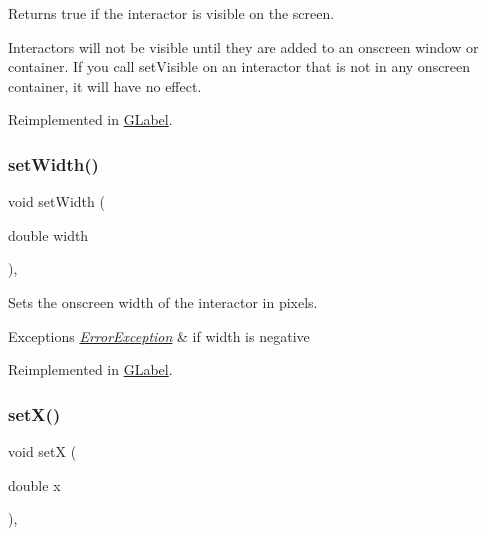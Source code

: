 Returns true if the interactor is visible on the screen. 

Interactors will not be visible until they are added to an onscreen window or container. If you call set\+Visible on an interactor that is not in any onscreen container, it will have no effect. 

Reimplemented in \mbox{\hyperlink{classGLabel_a95c2a1221e6c59e9de544054963b4b18}{G\+Label}}.

\mbox{\label{classGInteractor_aa3f3fba4cb131baa8696ba01e3bceca1}} 
\subsubsection{\texorpdfstring{set\+Width()}{setWidth()}}
{\footnotesize\ttfamily void set\+Width (\begin{DoxyParamCaption}\item[{double}]{width }\end{DoxyParamCaption})\hspace{0.3cm}{\ttfamily [virtual]}, {\ttfamily [inherited]}}



Sets the onscreen width of the interactor in pixels. 


\begin{DoxyExceptions}{Exceptions}
{\em \mbox{\hyperlink{classErrorException}{Error\+Exception}}} & if width is negative \\
\hline
\end{DoxyExceptions}


Reimplemented in \mbox{\hyperlink{classGLabel_aca9b9c666c4162ab0a27a10530bc0762}{G\+Label}}.

\mbox{\label{classGInteractor_a9c18fcc579333bf9653d13ad2b372e39}} 
\subsubsection{\texorpdfstring{set\+X()}{setX()}}
{\footnotesize\ttfamily void setX (\begin{DoxyParamCaption}\item[{double}]{x }\end{DoxyParamCaption})\hspace{0.3cm}{\ttfamily [virtual]}, {\ttfamily [inherited]}}



